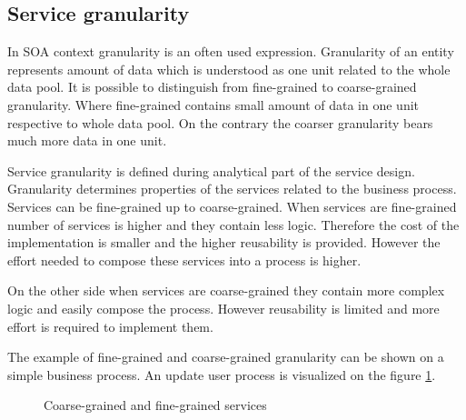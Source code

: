 \bigskip

\subsection{Service granularity}
\label{sec:granularity}
In SOA context granularity is an often used expression. Granularity of an entity represents amount of data which is understood as one unit related to the whole data pool. It is possible to distinguish from fine-grained to coarse-grained granularity. Where fine-grained contains small amount of data in one unit respective to whole data pool. On the contrary the coarser granularity bears much more data in one unit.

Service granularity is defined during analytical part of the service design. Granularity determines properties of the services related to the business process. Services can be fine-grained up to coarse-grained. When services are fine-grained number of services is higher and they contain less logic. Therefore the cost of the implementation is smaller and the higher reusability is provided. However the effort needed to compose these services into a process is higher. 

On the other side when services are coarse-grained they contain more complex logic and easily compose the process. However reusability is limited and more effort is required to implement them.

The example of fine-grained and coarse-grained granularity can be shown on a simple business process. An update user process is visualized on the figure \ref{fig:granularity}.

\begin{figure}[htp] 
\caption{Coarse-grained and fine-grained services}
\label{fig:granularity}
\end{figure}

